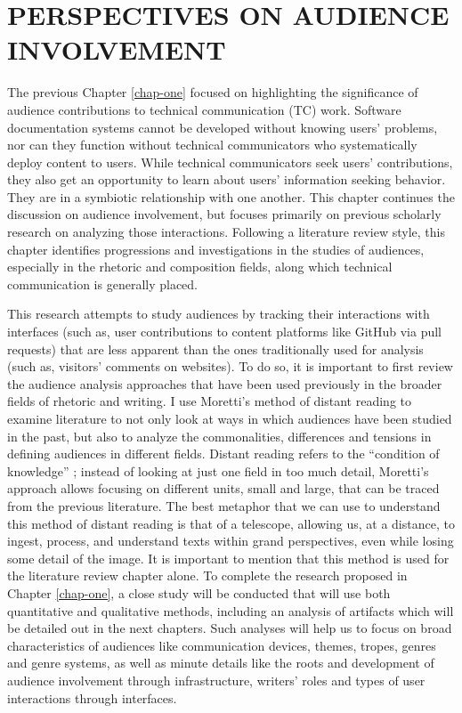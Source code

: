 \chapter{PERSPECTIVES ON AUDIENCE INVOLVEMENT}
\label{chap-two}

The previous Chapter \ref{chap-one} focused on highlighting the significance of audience contributions to technical communication (TC) work. Software documentation systems cannot be developed without knowing users’ problems, nor can they function without technical communicators who systematically deploy content to users. While technical communicators seek users’ contributions, they also get an opportunity to learn about users’ information seeking behavior. They are in a symbiotic relationship with one another. This chapter continues the discussion on audience involvement, but focuses primarily on previous scholarly research on analyzing those interactions. Following a literature review style, this chapter identifies progressions and investigations in the studies of audiences, especially in the rhetoric and composition fields, along which technical communication is generally placed.

This research attempts to study audiences by tracking their interactions with interfaces (such as, user contributions to content platforms like GitHub via pull requests) that are less apparent than the ones traditionally used for analysis (such as, visitors’ comments on websites). To do so, it is important to first review the audience analysis approaches that have been used previously in the broader fields of rhetoric and writing. I use Moretti’s \cite{moretti2000conjectures} method of distant reading to examine literature to not only look at ways in which audiences have been studied in the past, but also to analyze the commonalities, differences and tensions in defining audiences in different fields. Distant reading refers to the “condition of knowledge” \cite{moretti2000conjectures}; instead of looking at just one field in too much detail, Moretti’s approach allows focusing on different units, small and large, that can be traced from the previous literature. The  best  metaphor  that  we  can  use  to understand this method of distant reading is that of a telescope, allowing us, at a distance, to ingest, process, and understand texts within grand perspectives, even while losing some detail of the image. It is important to mention that this method is used for the literature review chapter alone. To complete the research proposed in Chapter \ref{chap-one}, a close study will be conducted that will use both quantitative and qualitative methods, including an analysis of artifacts which will be detailed out in the next chapters. Such analyses will help us to focus on broad characteristics of audiences like communication devices, themes, tropes, genres and genre systems, as well as minute details like the roots and development of audience involvement through infrastructure, writers’ roles and types of user interactions through interfaces.

